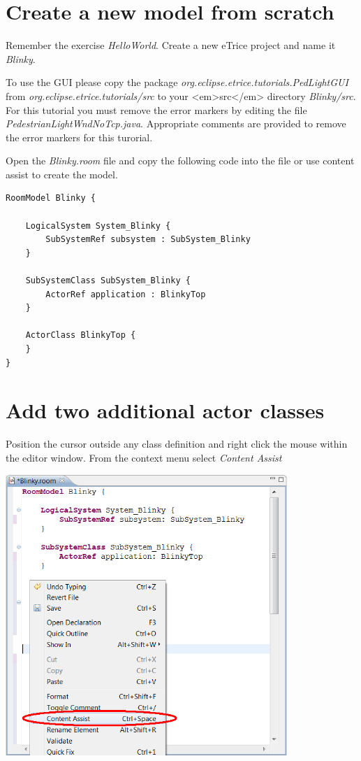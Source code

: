 \section{Create a new model from scratch}

Remember the exercise \textit{HelloWorld}.
Create a new eTrice project and name it \textit{Blinky}.

To use the GUI please copy the package \textit{org.eclipse.etrice.tutorials.PedLightGUI} from 
\textit{org.eclipse.etrice.tutorials/src} to your <em>src</em> directory \textit{Blinky/src}. For this tutorial 
you must remove the error markers by editing the file \textit{PedestrianLightWndNoTcp.java}. Appropriate 
comments are provided to remove the error markers for this turorial.

Open the \textit{Blinky.room} file and copy the following code into the file or use content assist to 
create the model.

\begin{verbatim} 
RoomModel Blinky {

    LogicalSystem System_Blinky {
        SubSystemRef subsystem : SubSystem_Blinky
    }

    SubSystemClass SubSystem_Blinky {
        ActorRef application : BlinkyTop
    }

    ActorClass BlinkyTop {
    }
}
\end{verbatim}

\section{Add two additional actor classes}

Position the cursor outside any class definition and right click the mouse within the editor window. From 
the context menu select \textit{Content Assist}  

\includegraphics[width=0.8\textwidth]{images/020-Blinky02.png}

